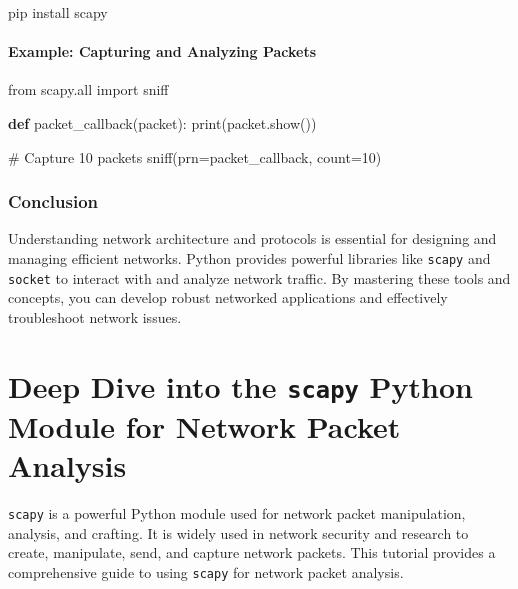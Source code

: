\documentclass[
  letterpaper,
  DIV=11,
  numbers=noendperiod]{scrreprt}
\newenvironment{Shaded}{\begin{snugshade}}{\end{snugshade}}
\newcommand{\BuiltInTok}[1]{\textcolor[rgb]{0.00,0.23,0.31}{#1}}
\newcommand{\CommentTok}[1]{\textcolor[rgb]{0.37,0.37,0.37}{#1}}
\newcommand{\DecValTok}[1]{\textcolor[rgb]{0.68,0.00,0.00}{#1}}
\newcommand{\ExtensionTok}[1]{\textcolor[rgb]{0.00,0.23,0.31}{#1}}
\newcommand{\ImportTok}[1]{\textcolor[rgb]{0.00,0.46,0.62}{#1}}
\newcommand{\KeywordTok}[1]{\textcolor[rgb]{0.00,0.23,0.31}{\textbf{#1}}}
\newcommand{\NormalTok}[1]{\textcolor[rgb]{0.00,0.23,0.31}{#1}}
\newcommand{\OperatorTok}[1]{\textcolor[rgb]{0.37,0.37,0.37}{#1}}
\begin{document}
\begin{Shaded}
\begin{Highlighting}[]
\ExtensionTok{pip}\NormalTok{ install scapy}
\end{Highlighting}
\end{Shaded}

\subsubsection{Example: Capturing and Analyzing
Packets}\label{example-capturing-and-analyzing-packets}

\begin{Shaded}
\begin{Highlighting}[]
\ImportTok{from}\NormalTok{ scapy.}\BuiltInTok{all} \ImportTok{import}\NormalTok{ sniff}

\KeywordTok{def}\NormalTok{ packet\_callback(packet):}
    \BuiltInTok{print}\NormalTok{(packet.show())}

\CommentTok{\# Capture 10 packets}
\NormalTok{sniff(prn}\OperatorTok{=}\NormalTok{packet\_callback, count}\OperatorTok{=}\DecValTok{10}\NormalTok{)}
\end{Highlighting}
\end{Shaded}

\subsection{Conclusion}\label{conclusion-43}

Understanding network architecture and protocols is essential for
designing and managing efficient networks. Python provides powerful
libraries like \texttt{scapy} and \texttt{socket} to interact with and
analyze network traffic. By mastering these tools and concepts, you can
develop robust networked applications and effectively troubleshoot
network issues.


\chapter{\texorpdfstring{Deep Dive into the \texttt{scapy} Python Module
for Network Packet
Analysis}{Deep Dive into the scapy Python Module for Network Packet Analysis}}\label{deep-dive-into-the-scapy-python-module-for-network-packet-analysis}

\texttt{scapy} is a powerful Python module used for network packet
manipulation, analysis, and crafting. It is widely used in network
security and research to create, manipulate, send, and capture network
packets. This tutorial provides a comprehensive guide to using
\texttt{scapy} for network packet analysis.
\end{document}

